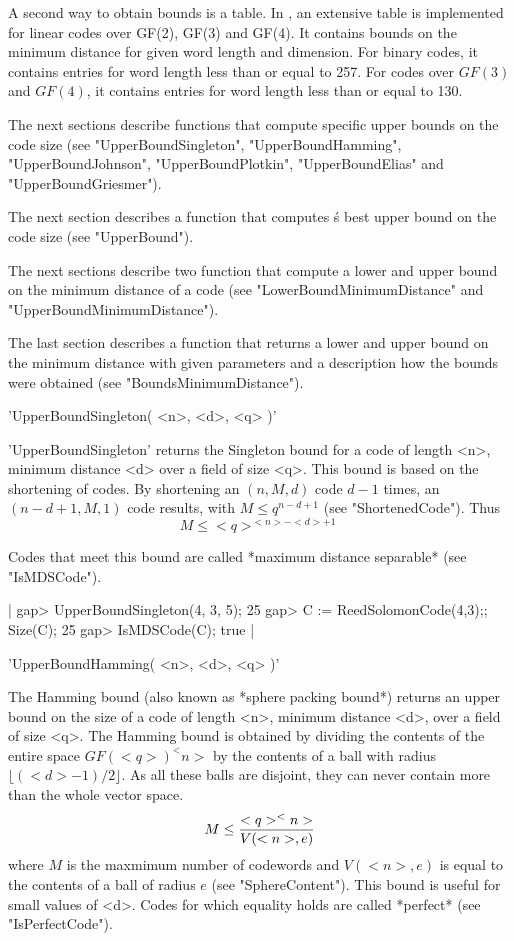 A second way to obtain bounds is a table. In {\GUAVA}, an extensive table
is implemented for linear codes over  GF(2), GF(3) and GF(4). It contains
bounds on the minimum distance for given  word length and dimension.  For
binary codes, it contains  entries for word  length less than or equal to
257. For  codes over $GF(3)$  and  $GF(4)$, it contains entries  for word
length less than or equal to 130.

The  next sections describe functions that  compute specific upper bounds
on  the    code  size (see   "UpperBoundSingleton",  "UpperBoundHamming",
"UpperBoundJohnson",       "UpperBoundPlotkin",    "UpperBoundElias"  and
"UpperBoundGriesmer").

The  next section  describes  a function  that computes  {\GUAVA}\'s best
upper bound on the code size (see "UpperBound").

The next sections  describe two function that compute  a lower  and upper
bound on the minimum distance of  a code (see "LowerBoundMinimumDistance"
and "UpperBoundMinimumDistance").

The last section  describes  a function  that  returns a lower and  upper
bound on the minimum distance with given parameters and a description how
the bounds were obtained (see "BoundsMinimumDistance").


'UpperBoundSingleton( <n>, <d>, <q> )'

'UpperBoundSingleton' returns the  Singleton bound for  a code of  length
<n>, minimum distance <d> over  a field of size  <q>. This bound is based
on  the  shortening of codes.  By  shortening an $(n,  M, d)$  code $d-1$
times,  an $(n-d+1,M,1)$   code results, with   $M  \leq  q^{n-d+1}$ (see
"ShortenedCode"). Thus
$$M \leq <q>^{<n>-<d>+1}$$

Codes that  meet this bound  are called *maximum distance separable* (see
"IsMDSCode").

|    gap> UpperBoundSingleton(4, 3, 5);
    25
    gap> C := ReedSolomonCode(4,3);; Size(C);
    25
    gap> IsMDSCode(C);
    true |


'UpperBoundHamming( <n>, <d>, <q> )'

The Hamming bound (also known as *sphere packing bound*) returns an upper
bound on the size of a code  of length <n>, minimum  distance <d>, over a
field of size <q>. The Hamming bound is obtained by dividing the contents
of the entire space $GF(<q>) ^<n>$ by the contents  of a ball with radius
$\lfloor(<d>-1) / 2\rfloor$.  As all  these balls are disjoint, they  can
never contain more than the whole vector  space.  $$M \leq {<q>^<n> \over
V(<n>,e)}$$ where $M$ is the maxmimum number  of codewords and $V(<n>,e)$
is   equal  to   the   contents   of   a  ball     of radius  $e$    (see
"SphereContent").  This bound is  useful for small  values of <d>.  Codes
for which equality holds are called *perfect* (see "IsPerfectCode").


